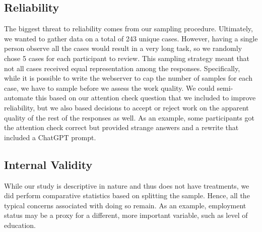 \subsection{Reliability}

The biggest threat to reliability comes from our sampling procedure.
Ultimately, we wanted to gather data on a total of 243 unique cases.
However, having a single person observe all the cases would result in a very long task, so we randomly chose 5 cases for each participant to review.
This sampling strategy meant that not all cases received equal representation among the responses.
Specifically, while it is possible to write the webserver to cap the number of samples for each case, we have to sample before we assess the work quality.
We could semi-automate this based on our attention check question that we included to improve reliability, but we also based decisions to accept or reject work on the apparent quality of the rest of the responses as well.
As an example, some participants got the attention check correct but provided strange answers and a rewrite that included a ChatGPT prompt.

\subsection{Internal Validity}

While our study is descriptive in nature and thus does not have treatments, we did perform comparative statistics based on splitting the sample.
Hence, all the typical concerns associated with doing so remain.
As an example, employment status may be a proxy for a different, more important variable, such as level of education.
